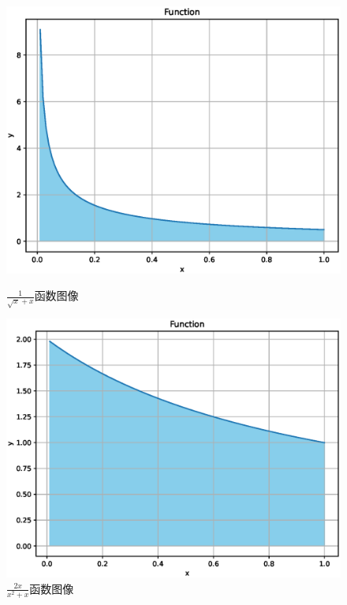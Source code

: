 \documentclass[12pt,a4paper]{article}%
\begin{document}
\begin{figure}[H]%
    \centering
    \begin{minipage}{0.48\textwidth}
        \centering
        \includegraphics[width=1.1\textwidth]{function2.eps}
        \caption{\fontsize{10pt}{15pt}\selectfont $\frac{1}{\sqrt{x}+x}$函数图像}
    \end{minipage}
    \hspace{0cm}%
    \hfill%
    \begin{minipage}{0.48\textwidth}
        \centering
        \includegraphics[width=1.1\textwidth]{function1.eps}
        \caption{\fontsize{10pt}{15pt}\selectfont $\frac{2x}{x^2+x}$函数图像}
    \end{minipage}\label{fig:figure2}
\end{figure}
\end{document}
